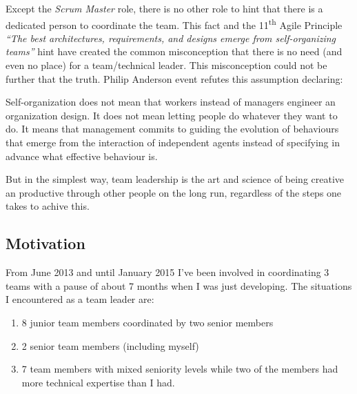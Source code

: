 Except the \textit{{Scrum Master}} role, there is no other role to hint that there is a dedicated person to coordinate the team. This fact and the 11\textsuperscript{th} Agile Principle \textit{``The best architectures, requirements, and designs emerge from self-organizing teams''}\cite{agile-manifesto} hint have created the common misconception that there is no need (and even no place) for a team/technical leader. This misconception could not be further that the truth. Philip Anderson event refutes this assumption declaring:

\begin{displayquote}
Self-organization does not mean that workers instead of managers engineer an organization design. It does not mean letting people do whatever they want to do. It means that management commits to guiding the evolution of behaviours that emerge from the interaction of independent agents instead of specifying in advance what effective behaviour is.
\end{displayquote}

But in the simplest way, team leadership is the art and science of being creative an productive through other people on the long run, regardless of the steps one takes to achive this.


\subsection{Motivation}
\label{sub-sec:motivation}

From June 2013 and until January 2015 I've been involved in coordinating 3 teams with a pause of about 7 months when I was just developing. The situations I encountered as a team leader are:

\begin{enumerate}
\item 8 junior team members coordinated by two senior members
\item 2 senior team members (including myself)
\item 7 team members with mixed seniority levels while two of the members had more technical expertise than I had.
\end{enumerate}

